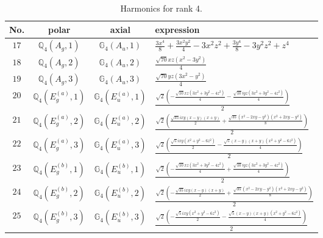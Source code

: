 \documentclass[fleqn,8pt,landscape]{jsarticle}
\begin{document}
\begin{table}[ht!]
\begin{center}
\caption{Harmonics for rank 4.}
\renewcommand{\arraystretch}{1.3}
\begin{tabular}{cccl} \hline \hline
No. & polar & axial & expression \\ \hline
$ 17 $ & $ \mathbb{Q}_{4}(A_{g},1) $ & $ \mathbb{G}_{4}(A_{u},1) $ & $ \frac{3 x^{4}}{8} + \frac{3 x^{2} y^{2}}{4} - 3 x^{2} z^{2} + \frac{3 y^{4}}{8} - 3 y^{2} z^{2} + z^{4} $ \\
$ 18 $ & $ \mathbb{Q}_{4}(A_{g},2) $ & $ \mathbb{G}_{4}(A_{u},2) $ & $ \frac{\sqrt{70} x z \left(x^{2} - 3 y^{2}\right)}{4} $ \\
$ 19 $ & $ \mathbb{Q}_{4}(A_{g},3) $ & $ \mathbb{G}_{4}(A_{u},3) $ & $ \frac{\sqrt{70} y z \left(3 x^{2} - y^{2}\right)}{4} $ \\
$ 20 $ & $ \mathbb{Q}_{4}(E_{g}^{(a)},1) $ & $ \mathbb{G}_{4}(E_{u}^{(a)},1) $ & $ \frac{\sqrt{2} \left(- \frac{\sqrt{10} x z \left(3 x^{2} + 3 y^{2} - 4 z^{2}\right)}{4} - \frac{\sqrt{10} i y z \left(3 x^{2} + 3 y^{2} - 4 z^{2}\right)}{4}\right)}{2} $ \\
$ 21 $ & $ \mathbb{Q}_{4}(E_{g}^{(a)},2) $ & $ \mathbb{G}_{4}(E_{u}^{(a)},2) $ & $ \frac{\sqrt{2} \left(\frac{\sqrt{35} i x y \left(x - y\right) \left(x + y\right)}{2} + \frac{\sqrt{35} \left(x^{2} - 2 x y - y^{2}\right) \left(x^{2} + 2 x y - y^{2}\right)}{8}\right)}{2} $ \\
$ 22 $ & $ \mathbb{Q}_{4}(E_{g}^{(a)},3) $ & $ \mathbb{G}_{4}(E_{u}^{(a)},3) $ & $ \frac{\sqrt{2} \left(\frac{\sqrt{5} i x y \left(x^{2} + y^{2} - 6 z^{2}\right)}{2} - \frac{\sqrt{5} \left(x - y\right) \left(x + y\right) \left(x^{2} + y^{2} - 6 z^{2}\right)}{4}\right)}{2} $ \\
$ 23 $ & $ \mathbb{Q}_{4}(E_{g}^{(b)},1) $ & $ \mathbb{G}_{4}(E_{u}^{(b)},1) $ & $ \frac{\sqrt{2} \left(- \frac{\sqrt{10} x z \left(3 x^{2} + 3 y^{2} - 4 z^{2}\right)}{4} + \frac{\sqrt{10} i y z \left(3 x^{2} + 3 y^{2} - 4 z^{2}\right)}{4}\right)}{2} $ \\
$ 24 $ & $ \mathbb{Q}_{4}(E_{g}^{(b)},2) $ & $ \mathbb{G}_{4}(E_{u}^{(b)},2) $ & $ \frac{\sqrt{2} \left(- \frac{\sqrt{35} i x y \left(x - y\right) \left(x + y\right)}{2} + \frac{\sqrt{35} \left(x^{2} - 2 x y - y^{2}\right) \left(x^{2} + 2 x y - y^{2}\right)}{8}\right)}{2} $ \\
$ 25 $ & $ \mathbb{Q}_{4}(E_{g}^{(b)},3) $ & $ \mathbb{G}_{4}(E_{u}^{(b)},3) $ & $ \frac{\sqrt{2} \left(- \frac{\sqrt{5} i x y \left(x^{2} + y^{2} - 6 z^{2}\right)}{2} - \frac{\sqrt{5} \left(x - y\right) \left(x + y\right) \left(x^{2} + y^{2} - 6 z^{2}\right)}{4}\right)}{2} $ \\
 \hline \hline
\end{tabular}
\end{center}
\end{table}
\end{document}
